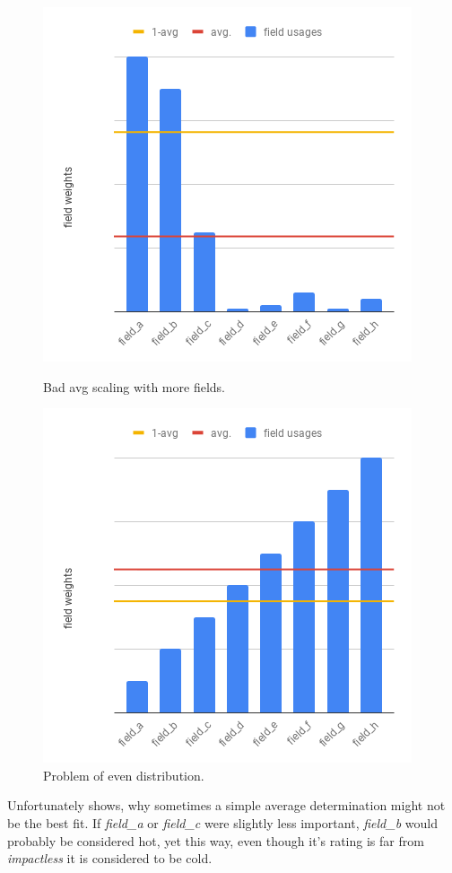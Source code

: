\begin{figure}[ht]
\begin{minipage}[b]{0.5\linewidth}
		\centering\includegraphics[width=\textwidth,height=0.7\textwidth]{PICs/avg_as_delimiter_3}
		\caption{Bad avg scaling with more fields.}
		\label{avg_delimiter_bad_2}
	\end{minipage}
	\hspace{0.5cm}
	\begin{minipage}[b]{0.5\linewidth}
		\centering\includegraphics[width=\textwidth,height=0.7\textwidth]{PICs/avg_as_delimiter_4}
		\caption{Problem of even distribution.}
		\label{avg_delimiter_bad_3}
	\end{minipage}
\end{figure}
Unfortunately  shows, why sometimes a simple average determination might not be the best fit. If \textit{field\_a} or \textit{field\_c} were slightly less important, \textit{field\_b} would probably be considered hot, yet this way, even though it's rating is far from \textit{impactless} it is considered to be cold.\\
